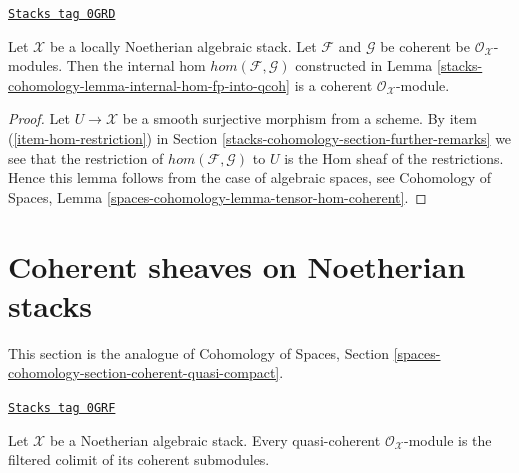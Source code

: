 \begin{lemma}
\label{stacks-cohomology-lemma-coherent-hom}
\href{https://stacks.math.columbia.edu/tag/0GRD}{\texttt{Stacks tag 0GRD}}

Let $\mathcal{X}$ be a locally Noetherian algebraic stack. Let $\mathcal{F}$
and $\mathcal{G}$ be coherent be $\mathcal{O}_\mathcal{X}$-modules. Then
the internal hom $hom(\mathcal{F}, \mathcal{G})$
constructed in Lemma \ref{stacks-cohomology-lemma-internal-hom-fp-into-qcoh}
is a coherent $\mathcal{O}_\mathcal{X}$-module.
\end{lemma}

\begin{proof}
Let $U \to \mathcal{X}$ be a smooth surjective morphism from a scheme.
By item (\ref{item-hom-restriction}) in Section \ref{stacks-cohomology-section-further-remarks}
we see that the restriction of
$hom(\mathcal{F}, \mathcal{G})$ to $U$ is the Hom sheaf of the restrictions.
Hence this lemma follows from the case of algebraic spaces, see
Cohomology of Spaces, Lemma \ref{spaces-cohomology-lemma-tensor-hom-coherent}.
\end{proof}

\section{Coherent sheaves on Noetherian stacks}
\label{stacks-cohomology-section-coherent-on-noetherian}
This section is the analogue of
Cohomology of Spaces, Section
\ref{spaces-cohomology-section-coherent-quasi-compact}.

\begin{lemma}
\label{stacks-cohomology-lemma-directed-colimit-coherent}
\href{https://stacks.math.columbia.edu/tag/0GRF}{\texttt{Stacks tag 0GRF}}

Let $\mathcal{X}$ be a Noetherian algebraic stack. Every quasi-coherent
$\mathcal{O}_\mathcal{X}$-module is the filtered colimit of its coherent
submodules.
\end{lemma}

